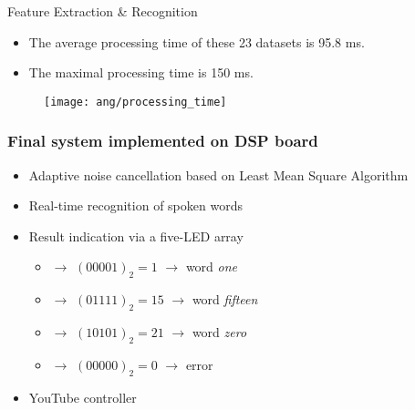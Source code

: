 \begin{frame}
Feature Extraction \& Recognition
\begin{itemize}
\item The average processing time of these 23 datasets is 95.8 ms.
\item The maximal processing time is 150 ms.
\end{itemize}

\begin{figure}[H]
\centering
\texttt{[image: ang/processing\_time]}
\end{figure}
\end{frame}


\begin{frame}
\frametitle{Final system implemented on DSP board}
\begin{itemize}
	\item Adaptive noise cancellation based on Least Mean Square Algorithm
	\item Real-time recognition of spoken words
	\item Result indication via a five-LED array
		\begin{itemize}
		\item \LED\offLED\offLED\offLED\offLED\onLED $\longrightarrow$ $(00001)_2 = 1$ $\longrightarrow$ word \textit{one}
		\item \LED\offLED\onLED\onLED\onLED\onLED $\longrightarrow$ $(01111)_2 = 15$ $\longrightarrow$ word \textit{fifteen}
		\item \LED\onLED\offLED\onLED\offLED\onLED $\longrightarrow$ $(10101)_2 = 21$ $\longrightarrow$ word \textit{zero}
		\item \LED\offLED\offLED\offLED\offLED\offLED $\longrightarrow$ $(00000)_2 = 0$ $\longrightarrow$ error
		\end{itemize}
	\item YouTube controller
\end{itemize}
\end{frame}


